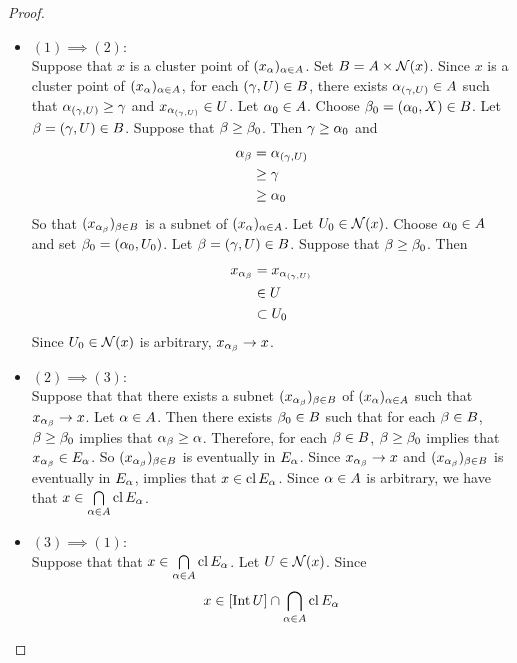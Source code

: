 \documentclass{book}
\begin{document}
	\begin{proof}\
		\begin{itemize}
			\item $(1) \implies (2)$: \\
			Suppose that $x$ is a cluster point of $(x_{\alpha})_{\alpha \in A}$. Set $B = A \times \mathcal{N}(x)$. Since $x$ is a cluster point of $(x_{\alpha})_{\alpha \in A}$, for each $(\gamma, U) \in B$, there exists $\alpha_{(\gamma, U)} \in A$ such that $\alpha_{(\gamma, U)} \geq \gamma$ and $x_{\alpha_{(\gamma, U)}} \in U$. Let $\alpha_0 \in A$. Choose $\beta_0 = (\alpha_0, X) \in B$. Let $\beta = (\gamma, U) \in B$. Suppose that $\beta \geq \beta_0$. Then $\gamma \geq \alpha_0$ and 
			\begin{align*}
				\alpha_{\beta}
				&= \alpha_{(\gamma, U)} \\
				& \geq \gamma \\
				& \geq \alpha_0
			\end{align*}
			So that $(x_{\alpha_{\beta}})_{\beta \in B}$ is a subnet of $(x_{\alpha})_{\alpha \in A}$. Let $U_0 \in \mathcal{N}(x)$. Choose $\alpha_0 \in A$ and set $\beta_0 = (\alpha_0, U_0)$. Let $\beta = (\gamma, U) \in B$. Suppose that $\beta \geq \beta_0$. Then 
			\begin{align*}
				x_{\alpha_{\beta}} 
				&= x_{\alpha_{(\gamma, U)}} \\
				& \in U \\
				&\subset U_0
			\end{align*} 
			Since $U_0 \in \mathcal{N}(x)$ is arbitrary, $x_{\alpha_{\beta}} \rightarrow x$.
			\item $(2) \implies (3)$: \\
			Suppose that that there exists a subnet $(x_{\alpha_{\beta}})_{\beta \in B}$ of $(x_{\alpha})_{\alpha \in A}$ such that $x_{\alpha_{\beta}} \rightarrow x$. Let $\alpha \in A$. Then there exists $\beta_0 \in B$ such that for each $\beta \in B$, $\beta \geq \beta_0$ implies that $\alpha_{\beta} \geq \alpha$. Therefore, for each $\beta \in B$, $\beta \geq \beta_0$ implies that $x_{\alpha_{\beta}} \in E_{\alpha}$. So $(x_{\alpha_{\beta}})_{\beta \in B}$ is eventually in $E_{\alpha}$. Since $x_{\alpha_{\beta}} \rightarrow x$ and $(x_{\alpha_{\beta}})_{\beta \in B}$ is eventually in $E_{\alpha}$,  implies that $x \in \operatorname{cl} E_{\alpha}$. Since $\alpha \in A$ is arbitrary, we have that $x \in \bigcap\limits_{\alpha \in A} \operatorname{cl} E_{\alpha}$. 
			\item $(3) \implies (1)$: \\
			Suppose that that $x \in \bigcap\limits_{\alpha \in A} \operatorname{cl} E_{\alpha}$. Let $U \in \mathcal{N}(x)$. Since 
			\begin{align*}
				x 
				& \in [\Int U] \cap \bigcap\limits_{\al \in A} \cl E_{\al} \\

\end{align*}
\end{itemize}
\end{proof}
\end{document}
